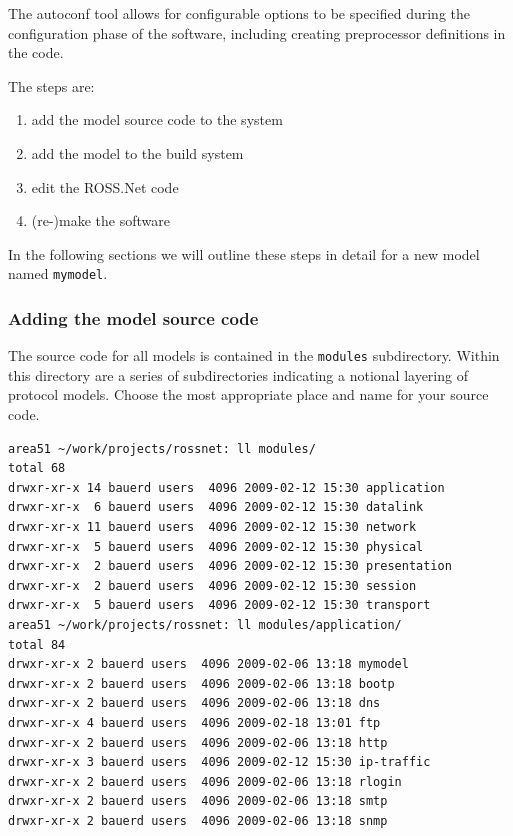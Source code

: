 \documentclass[conference,onecolumn]{IEEEtran}
\begin{document}
The autoconf tool allows for configurable options to be specified during the configuration phase of the software, including creating preprocessor definitions in the code.

The steps are:

\begin{enumerate}
  \item add the model source code to the system
  \item add the model to the build system
  \item edit the ROSS.Net code
  \item (re-)make the software
\end{enumerate}

In the following sections we will outline these steps in detail for a new model named {\tt mymodel}.

\subsubsection{Adding the model source code}

The source code for all models is contained in the {\tt modules} subdirectory. Within this directory are a series of subdirectories indicating a notional layering of protocol models.  Choose the most appropriate place and name for your source code.

\begin{small}\begin{verbatim}
area51 ~/work/projects/rossnet: ll modules/
total 68
drwxr-xr-x 14 bauerd users  4096 2009-02-12 15:30 application
drwxr-xr-x  6 bauerd users  4096 2009-02-12 15:30 datalink
drwxr-xr-x 11 bauerd users  4096 2009-02-12 15:30 network
drwxr-xr-x  5 bauerd users  4096 2009-02-12 15:30 physical
drwxr-xr-x  2 bauerd users  4096 2009-02-12 15:30 presentation
drwxr-xr-x  2 bauerd users  4096 2009-02-12 15:30 session
drwxr-xr-x  5 bauerd users  4096 2009-02-12 15:30 transport
area51 ~/work/projects/rossnet: ll modules/application/
total 84
drwxr-xr-x 2 bauerd users  4096 2009-02-06 13:18 mymodel
drwxr-xr-x 2 bauerd users  4096 2009-02-06 13:18 bootp
drwxr-xr-x 2 bauerd users  4096 2009-02-06 13:18 dns
drwxr-xr-x 4 bauerd users  4096 2009-02-18 13:01 ftp
drwxr-xr-x 2 bauerd users  4096 2009-02-06 13:18 http
drwxr-xr-x 3 bauerd users  4096 2009-02-12 15:30 ip-traffic
drwxr-xr-x 2 bauerd users  4096 2009-02-06 13:18 rlogin
drwxr-xr-x 2 bauerd users  4096 2009-02-06 13:18 smtp
drwxr-xr-x 2 bauerd users  4096 2009-02-06 13:18 snmp
\end{verbatim}\end{small}
\end{document}
